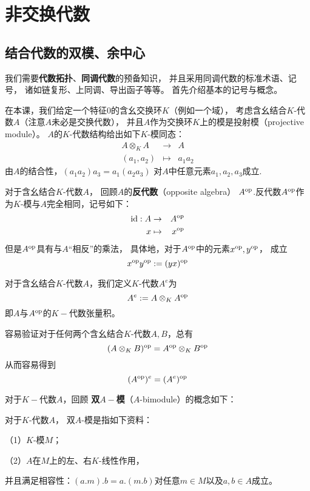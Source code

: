 \chapter{非交换代数}

\section{结合代数的双模、余中心}

我们需要\textbf{代数拓扑}、\textbf{同调代数}的预备知识，
并且采用同调代数的标准术语、记号，
诸如链复形、上同调、导出函子等等。
首先介绍基本的记号与概念。

在本课，我们给定一个特征$0$的含幺交换环$K$（例如一个域），
考虑含幺结合$K$-代数$A$（注意$A$未必是交换代数），
并且$A$作为交换环$K$上的模是投射模（projective module）。
$A$的$K$-代数结构给出如下$K$-模同态：
\begin{eqnarray*}
A\otimes_KA        &\rightarrow& A\\
(a_1,a_2)          &\mapsto    & a_1a_2
\end{eqnarray*}
由$A$的结合性，$(a_1a_2)a_3=a_1(a_2a_3)$
对$A$中任意元素$a_1,a_2,a_3$成立.

对于含幺结合$K$-代数$A$，
回顾$A$的\textbf{反代数}（opposite algebra）
$A^{\text{op}}$.反代数$A^{\text{op}}$作为$K$-模与$A$完全相同，记号如下：
\begin{eqnarray*}
\text{id}:A &\rightarrow & A^{\text{op}}\\
x&\mapsto&x^{\text{op}}
\end{eqnarray*}
但是$A^{\text{op}}$具有与$A$“相反”的乘法，
具体地，对于$A^{\text{op}}$中的元素$x^{\text{op}},y^{\text{op}}$，
成立
$$x^{\text{op}} y^{\text{op}}:=(yx)^{\text{op}}$$

\begin{definition}
对于含幺结合$K$-代数$A$，我们定义$K$-代数$A^e$为
$$A^e:=A\otimes_K A^{\text{op}}$$
即$A$与$A^{\text{op}}$的$K-$代数张量积。
\end{definition}

容易验证对于任何两个含幺结合$K$-代数$A,B$，总有
$$(A\otimes_K B)^{\text{op}}=A^{\text{op}}\otimes_{K}B^{\text{op}}$$
从而容易得到
$$(A^{\text{op}})^e=(A^e)^{\text{op}}$$

对于$K-$代数$A$，回顾
\textbf{双$A-$模}（$A$-bimodule）的概念如下：

\begin{definition}对于$K$-代数$A$，
双$A$-模是指如下资料：

（1）$K$-模$M$；

（2）$A$在$M$上的左、右$K$-线性作用，

并且满足相容性：$(a.m).b=a.(m.b)$对任意$m\in M$以及$a,b\in A$成立。
\end{definition}

